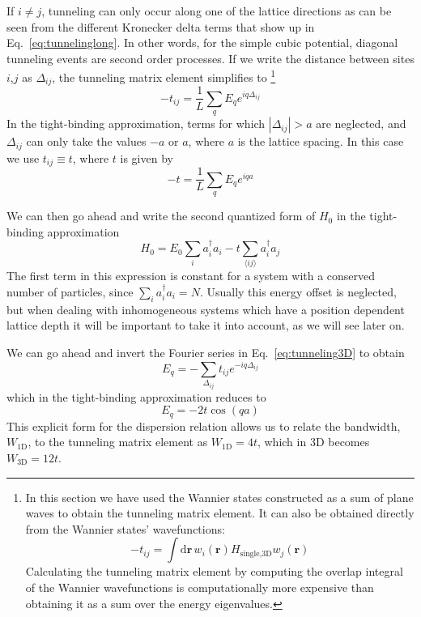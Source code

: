 \documentclass[oneside,11pt]{memoir}
\newcommand{\bv}[1]{\ensuremath{\bm{#1}}}
\begin{document}
If $i\neq j$,  tunneling can only occur along one of the lattice directions as
can be seen from the different Kronecker delta terms that show up in
Eq.~\ref{eq:tunnelinglong}.   In other words, for the simple cubic potential,
diagonal tunneling events are second order processes.  If we write the distance
between sites $i$,$j$ as $\Delta_{ij}$, the tunneling matrix element simplifies
to  \footnote{In this section we have used the Wannier states constructed as a
sum of plane waves to obtain the tunneling matrix element.  It can also be
obtained directly from the Wannier states'  wavefunctions:
\begin{equation}
  -t_{ij} = \int \mathrm{d}\bv{r} \, w_{i}(\bv{r}) H_{\text{single,3D}} w_{j}(\bv{r}) 
\end{equation}
Calculating the tunneling matrix element by computing the overlap integral of
the Wannier wavefunctions is computationally more expensive than obtaining it as
a sum over the energy eigenvalues. }
\begin{equation}
  -t_{ij} = \frac{1}{L} \sum_{q} E_{q} e^{iq \Delta_{ij}} 
\label{eq:tunneling3D}
\end{equation}
In the tight-binding approximation, terms for which $|\Delta_{ij}|>a$ are
neglected, and  $\Delta_{ij}$ can only take the values $-a$ or $a$,
where $a$ is the lattice spacing.  In this case we use $t_{ij}\equiv t$, where
$t$ is given by
\begin{equation}
  -t = \frac{1}{L} \sum_{q} E_{q} e^{iqa} 
\label{eq:tunneling3D_tight}
\end{equation}

We can then go ahead and write the second quantized form of $H_{0}$ in the
tight-binding approximation 
\begin{equation} 
  H_{0}  =  E_{0} \sum_{i}  a_{i}^{\dagger} a_{i}  - t 
    \sum_{ \langle i j \rangle }
                      a_{i}^{\dagger} a_{j}   
\end{equation} 
The first term in this expression is constant for a system with a conserved
number of particles, since $\sum_{i}  a_{i}^{\dagger} a_{i}=N$.    Usually this
energy offset is neglected, but when dealing with inhomogeneous systems which
have a position dependent lattice depth it will be important to take it into
account, as we will see later on.   


We can go ahead and invert the Fourier series in Eq.~\ref{eq:tunneling3D} to
obtain 
\begin{equation} 
  E_{q} = - \sum_{\Delta_{ij}} t_{ij} e^{-iq \Delta_{ij}} 
\end{equation}
which in the tight-binding approximation reduces to 
\begin{equation}
  E_{q} = -2 t\cos( qa) 
\end{equation}
This explicit form for the dispersion relation allows us to relate the
bandwidth, $W_{\text{1D}}$, to the tunneling matrix element as
$W_{\text{1D}}=4t$,  which in 3D becomes $W_{\text{3D}}= 12t$.
\end{document}
